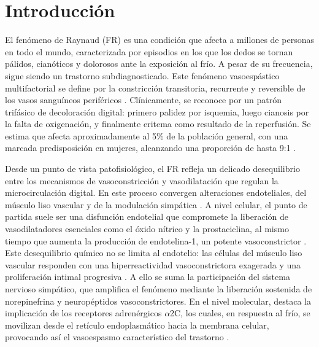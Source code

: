 \section{Introducción}

El fenómeno de Raynaud (FR) es una condición que afecta a millones de personas en todo el mundo, caracterizada por episodios en los que los dedos se tornan pálidos, cianóticos y dolorosos ante la exposición al frío. A pesar de su frecuencia, sigue siendo un trastorno subdiagnosticado. Este fenómeno vasoespástico multifactorial se define por la constricción transitoria, recurrente y reversible de los vasos sanguíneos periféricos \cite{Nawaz2022, Herrick2012}. Clínicamente, se reconoce por un patrón trifásico de decoloración digital: primero palidez por isquemia, luego cianosis por la falta de oxigenación, y finalmente eritema como resultado de la reperfusión. Se estima que afecta aproximadamente al 5\% de la población general, con una marcada predisposición en mujeres, alcanzando una proporción de hasta 9:1 \cite{Herrick2012, Musa2023, Garner2015, Ingegnoli2022}.  

Desde un punto de vista patofisiológico, el FR refleja un delicado desequilibrio entre los mecanismos de vasoconstricción y vasodilatación que regulan la microcirculación digital. En este proceso convergen alteraciones endoteliales, del músculo liso vascular y de la modulación simpática \cite{Herrick2005, Flavahan2015}. A nivel celular, el punto de partida suele ser una disfunción endotelial que compromete la liberación de vasodilatadores esenciales como el óxido nítrico y la prostaciclina, al mismo tiempo que aumenta la producción de endotelina-1, un potente vasoconstrictor \cite{Flavahan2008, Blann1993, Freedman1999}. Este desequilibrio químico no se limita al endotelio: las células del músculo liso vascular responden con una hiperreactividad vasoconstrictora exagerada y una proliferación intimal progresiva \cite{Fardoun2016, Cooke2004}. A ello se suma la participación del sistema nervioso simpático, que amplifica el fenómeno mediante la liberación sostenida de norepinefrina y neuropéptidos vasoconstrictores. En el nivel molecular, destaca la implicación de los receptores adrenérgicos $\alpha$2C, los cuales, en respuesta al frío, se movilizan desde el retículo endoplasmático hacia la membrana celular, provocando así el vasoespasmo característico del trastorno \cite{Fardoun2016, Flavahan2008, Chotani2000}.  

